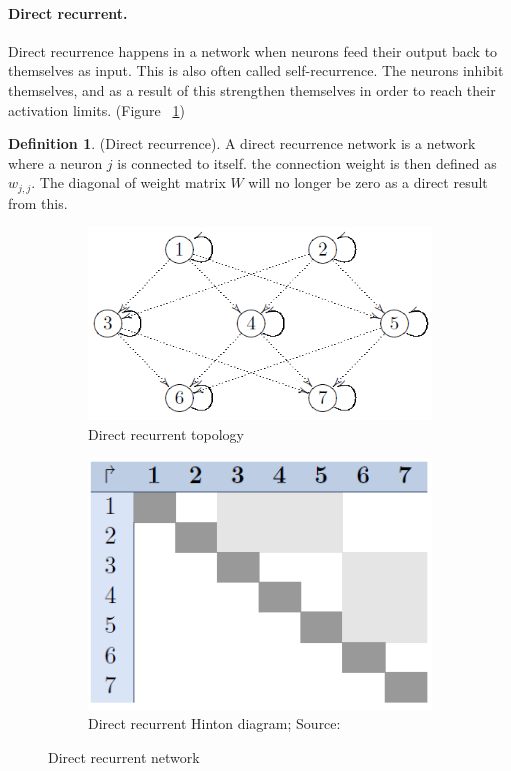 \documentclass[pdftex,a4paper,12pt,twoside]{report}
\theoremstyle{plain} \newtheorem{theorem}{Theorem} \newtheorem{proposition}{Proposition} \newtheorem{lemma}{Lemma} \newtheorem*{corollary}{Corollary}
\theoremstyle{definition} \newtheorem{definition}{Definition} \newtheorem{conjecture}{Conjecture} \newtheorem*{example}{Example} \newtheorem{algorithm}{Algorithm}
\theoremstyle{remark} \newtheorem*{remark}{Remark} \newtheorem*{note}{Note} \newtheorem{case}{Case}
\begin{document}
\paragraph{Direct recurrent.}
Direct recurrence happens in a network when neurons feed their output back to themselves as input. This is also often called self-recurrence. The neurons inhibit themselves, and as a result of this strengthen themselves in order to reach their activation limits. (Figure ~\ref{fig:directrecurrent})
\begin{definition}
(Direct recurrence). A direct recurrence network is a network where a neuron $j$ is connected to itself. the connection weight is then defined as $w_{j,j}$. The diagonal of weight matrix $W$ will no longer be zero as a direct result from this.
\end{definition}
\begin{figure}
\centering
	\begin{subfigure}[b]{0.3\textwidth}
	\centering
	\includegraphics[width=\textwidth]{./img/recurrent-direct-Topology.png}
	\caption{Direct recurrent topology}
	\end{subfigure}
	\begin{subfigure}[b]{0.3\textwidth}
	\centering
	\includegraphics[width=\textwidth]{./img/recurrent-direct-Hinton.png}
	\caption{Direct recurrent Hinton diagram; Source:\citep{Kriesel2013}}
	\end{subfigure}
\caption{Direct recurrent network}
\label{fig:directrecurrent}
\end{figure}
\end{document}
